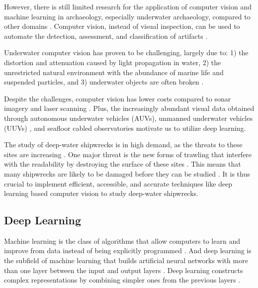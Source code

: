 \documentclass[a4paper, 11pt, oneside]{article}
\begin{document}
However, there is still limited research for the application of computer vision and machine learning in archaeology,
especially underwater archaeology, compared to other domains \cite{maaten2007computer, qin2015underwater}.
Computer vision, instead of visual inspection, can be used to automate the detection, assessment, and classification
of artifacts \cite{maaten2007computer}.

Underwater computer vision has proven to be challenging, largely due to: 1) the distortion and attenuation caused by
light propagation in water, 2) the unrestricted natural environment with the abundance of marine life and suspended
particles, and 3) underwater objects are often broken
\cite{qin2015underwater, rizzini2015investigation, lu2017underwater, mccarthy20193d}.

Despite the challenges, computer vision has lower costs \cite{rizzini2015investigation} compared to sonar imagery
\cite{abu2019statistically} and laser scanning \cite{gordon1992use}. Plus, the increasingly abundant visual data obtained
through autonomous underwater vehicles (AUVs), unmanned underwater vehicles (UUVs)
\cite{lu2017underwater, moniruzzaman2017deep}, and seafloor cabled observatories \cite{qin2015underwater} motivate us
to utilize deep learning.

The study of deep-water shipwrecks is in high demand, as the threats to these sites are increasing
\cite{drap2015underwater}. One major threat is the new forms of trawling that interfere with the readability by
destroying the surface of these sites \cite{drap2015underwater}. This means that many shipwrecks are likely to be damaged
before they can be studied \cite{drap2015underwater}. It is thus crucial to implement efficient, accessible, and accurate
techniques like deep learning based computer vision to study deep-water shipwrecks.

\subsection{Deep Learning}

Machine learning is the class of algorithms that allow computers to learn and improve from data instead of being
explicitly programmed \cite{samuel1959some, geron2019hands}. And deep learning is the subfield of machine learning that
builds artificial neural networks with more than one layer between the input and output layers
\cite{geron2019hands, burkov2019hundred, zhang2018definition}. Deep learning constructs complex representations by
combining simpler ones from the previous layers \cite{goodfellow2016deep}.
\end{document}
